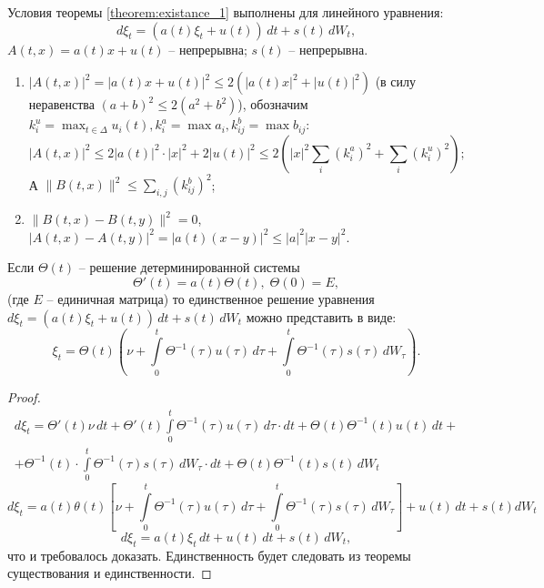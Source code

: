 \begin{ex}
  Условия теоремы \ref{theorem:existance_1} выполнены для линейного уравнения:
  \[
    d\xi_t = (a(t) \xi_t + u(t)) \, dt + s(t) \, dW_t,
  \]
  $A(t, x) = a(t) x + u(t)$ -- непрерывна; $s(t)$ -- непрерывна.
  \begin{enumerate}
    \item $|A(t, x)|^2 = |a(t) x + u(t)|^2 \leqslant 2( |a(t) x|^2 + |u(t)|^2 )$ (в силу неравенства $(a+b)^2 \leqslant 2(a^2 + b^2)$), обозначим $k_i^u = \max_{t\in\Delta} u_i(t), k_i^a = \max a_i, k_{ij}^b = \max b_{ij}$:
      \[
        |A(t, x)|^2 \leqslant 2 |a(t)|^2 \cdot |x|^2 + 2 |u(t)|^2 \leqslant 2 \left(|x|^2 \sum_i (k_i^a)^2 + \sum_i (k_i^u)^2\right);
      \]
      А $\| B(t, x) \|^2 \leqslant \sum_{i, j} (k_{ij}^b)^2$;

    \item $\| B(t, x) - B(t, y) \|^2 = 0$, $|A(t, x) - A(t, y)|^2 = |a(t) (x-y)|^2 \leqslant |a|^2 |x-y|^2$.
  \end{enumerate}
\end{ex}


\begin{theorem}
  Если $\Theta(t)$ -- решение детерминированной системы
  \[
    \Theta'(t) = a(t) \Theta(t), \; \Theta(0) = E,
  \]
  (где $E$ -- единичная матрица)
  то единственное решение уравнения $d\xi_t = \left(a(t)\xi_t + u(t)\right) \, dt + s(t) \, dW_t$
  можно представить в виде:
  \[
    \xi_t = \Theta(t) \left( \nu + \int\limits_0^t \Theta^{-1}(\tau) u(\tau) \, d\tau + \int\limits_0^t \Theta^{-1}(\tau) s(\tau) \, dW_\tau \right).
  \]
\end{theorem}
\begin{proof}
  \begin{multline*}
    d\xi_t = \Theta'(t) \nu \, dt +
    \Theta'(t) \int\limits_0^t \Theta^{-1}(\tau) u(\tau) \, d\tau \cdot dt +
    \Theta(t) \Theta^{-1}(t) u(t) \, dt + \\ 
    + \Theta^{-1}(t) \cdot \int\limits_0^t \Theta^{-1}(\tau) s(\tau) \, dW_\tau \cdot dt + 
    \Theta(t) \Theta^{-1}(t) s(t) \, dW_t
  \end{multline*}
  \[
    d\xi_t = a(t) \theta(t) \left[ \nu + \int\limits_0^t \Theta^{-1}(\tau) u(\tau) \, d\tau + \int\limits_0^t \Theta^{-1}(\tau) s(\tau) \, dW_\tau \right] + u(t) \, dt+ s(t) dW_t
  \]
  \[
    d\xi_t = a(t) \xi_t \, dt + u(t) \, dt + s(t) \, dW_t,
  \]
  что и требовалось доказать. Единственность будет следовать из теоремы существования
  и единственности.
\end{proof}


